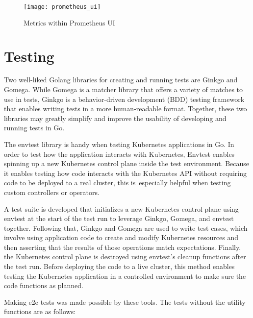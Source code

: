 \begin{figure}[H]
	\centering
	\texttt{[image: prometheus\_ui]}
	\label{fig:prometheus_ui}
	\caption{Metrics within Prometheus UI}
\end{figure}

\section{Testing}

Two well-liked Golang libraries for creating and running tests are Ginkgo and Gomega. While Gomega is a matcher library that offers a variety of matches to use in tests, Ginkgo is a behavior-driven development (BDD) testing framework that enables writing tests in a more human-readable format. Together, these two libraries may greatly simplify and improve the usability of developing and running tests in Go.

The envtest library is handy when testing Kubernetes applications in Go. In order to test how the application interacts with Kubernetes, Envtest enables spinning up a new Kubernetes control plane inside the test environment. Because it enables testing how code interacts with the Kubernetes API without requiring code to be deployed to a real cluster, this is especially helpful when testing custom controllers or operators.

A test suite is developed that initializes a new Kubernetes control plane using envtest at the start of the test run to leverage Ginkgo, Gomega, and envtest together. Following that, Ginkgo and Gomega are used to write test cases, which involve using application code to create and modify Kubernetes resources and then asserting that the results of those operations match expectations. Finally, the Kubernetes control plane is destroyed using envtest's cleanup functions after the test run. Before deploying the code to a live cluster, this method enables testing the Kubernetes application in a controlled environment to make sure the code functions as planned.

Making e2e tests was made possible by these tools. The tests without the utility functions are as follows:

